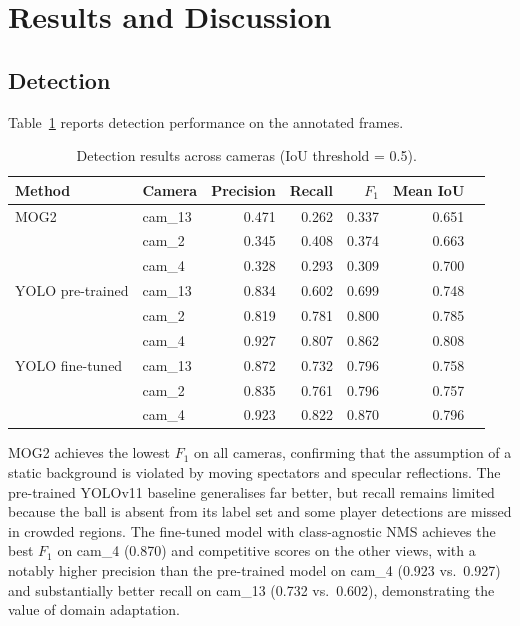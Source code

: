 \section{Results and Discussion}\label{sec:results}

\providecommand{\multirow}[3]{#3}

\subsection{Detection}

Table~\ref{tab:detection} reports detection performance on the annotated frames.

\begin{table}[t]
\centering
\caption{Detection results across cameras (IoU threshold = 0.5).}
\label{tab:detection}
\small
\begin{tabular}{llrrrrr}
\toprule
Method & Camera & Precision & Recall & $F_1$ & Mean IoU \\
\midrule
\multirow{3}{*}{MOG2}
  & cam\_13 & 0.471 & 0.262 & 0.337 & 0.651 \\
  & cam\_2  & 0.345 & 0.408 & 0.374 & 0.663 \\
  & cam\_4  & 0.328 & 0.293 & 0.309 & 0.700 \\
\midrule
\multirow{3}{*}{YOLO pre-trained}
  & cam\_13 & 0.834 & 0.602 & 0.699 & 0.748 \\
  & cam\_2  & 0.819 & 0.781 & 0.800 & 0.785 \\
  & cam\_4  & 0.927 & 0.807 & 0.862 & 0.808 \\
\midrule
\multirow{3}{*}{YOLO fine-tuned}
  & cam\_13 & 0.872 & 0.732 & 0.796 & 0.758 \\
  & cam\_2  & 0.835 & 0.761 & 0.796 & 0.757 \\
  & cam\_4  & 0.923 & 0.822 & 0.870 & 0.796 \\
\bottomrule
\end{tabular}
\end{table}

MOG2 achieves the lowest $F_1$ on all cameras, confirming that the assumption of a
static background is violated by moving spectators and specular reflections.
The pre-trained YOLOv11 baseline generalises far better, but recall remains
limited because the ball is absent from its label set and some player detections are
missed in crowded regions.
The fine-tuned model with class-agnostic NMS achieves the best $F_1$ on cam\_4
(0.870) and competitive scores on the other views, with a notably higher precision
than the pre-trained model on cam\_4 (0.923 vs.\ 0.927) and substantially better
recall on cam\_13 (0.732 vs.\ 0.602), demonstrating the value of domain adaptation.

